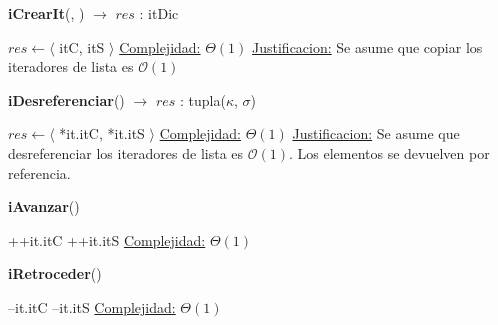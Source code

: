 \documentclass[a4paper,10pt]{article}
\begin{document}
\begin{Algoritmos}

\begin{algorithm}[H]{\textbf{iCrearIt}(,
    ) $\to$ $res$ : itDic}
  \begin{algorithmic}[1]
      \State $res \gets \langle$ itC, itS $\rangle$
      \medskip
      \Statex \underline{Complejidad:} $\Theta(1)$
      \Statex \underline{Justificacion:} Se asume que copiar los iteradores de
      lista es $\mathcal{O}(1)$
  \end{algorithmic}
\end{algorithm}

\begin{algorithm}[H]{\textbf{iDesreferenciar}() $\to$ $res$ : tupla($\kappa$, $\sigma$)}
  \begin{algorithmic}[1]
      \State $res \gets \langle$ *it.itC, *it.itS $\rangle$
      \medskip
      \Statex \underline{Complejidad:} $\Theta(1)$
      \Statex \underline{Justificacion:} Se asume que desreferenciar los
      iteradores de lista es $\mathcal{O}(1)$. Los elementos se devuelven por
      referencia.
  \end{algorithmic}
\end{algorithm}

\begin{algorithm}[H]{\textbf{iAvanzar}()}
  \begin{algorithmic}[1]
      \State ++it.itC
      \State ++it.itS
      \medskip
      \Statex \underline{Complejidad:} $\Theta(1)$
  \end{algorithmic}
\end{algorithm}

\begin{algorithm}[H]{\textbf{iRetroceder}()}
  \begin{algorithmic}[1]
      \State --it.itC
      \State --it.itS
      \medskip
      \Statex \underline{Complejidad:} $\Theta(1)$
  \end{algorithmic}
\end{algorithm}

\end{Algoritmos}
\end{document}
